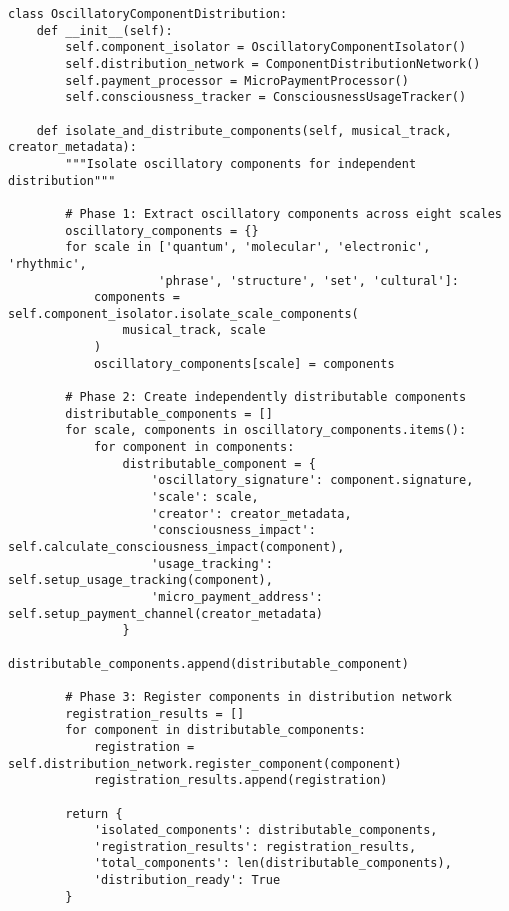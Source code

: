 \documentclass[12pt,a4paper]{article}
\begin{document}
\begin{lstlisting}[style=pythonstyle, caption=Oscillatory Component Isolation and Distribution]
class OscillatoryComponentDistribution:
    def __init__(self):
        self.component_isolator = OscillatoryComponentIsolator()
        self.distribution_network = ComponentDistributionNetwork()
        self.payment_processor = MicroPaymentProcessor()
        self.consciousness_tracker = ConsciousnessUsageTracker()
        
    def isolate_and_distribute_components(self, musical_track, creator_metadata):
        """Isolate oscillatory components for independent distribution"""
        
        # Phase 1: Extract oscillatory components across eight scales
        oscillatory_components = {}
        for scale in ['quantum', 'molecular', 'electronic', 'rhythmic', 
                     'phrase', 'structure', 'set', 'cultural']:
            components = self.component_isolator.isolate_scale_components(
                musical_track, scale
            )
            oscillatory_components[scale] = components
        
        # Phase 2: Create independently distributable components
        distributable_components = []
        for scale, components in oscillatory_components.items():
            for component in components:
                distributable_component = {
                    'oscillatory_signature': component.signature,
                    'scale': scale,
                    'creator': creator_metadata,
                    'consciousness_impact': self.calculate_consciousness_impact(component),
                    'usage_tracking': self.setup_usage_tracking(component),
                    'micro_payment_address': self.setup_payment_channel(creator_metadata)
                }
                distributable_components.append(distributable_component)
        
        # Phase 3: Register components in distribution network
        registration_results = []
        for component in distributable_components:
            registration = self.distribution_network.register_component(component)
            registration_results.append(registration)
        
        return {
            'isolated_components': distributable_components,
            'registration_results': registration_results,
            'total_components': len(distributable_components),
            'distribution_ready': True
        }
    

\end{lstlisting}
\end{document}
